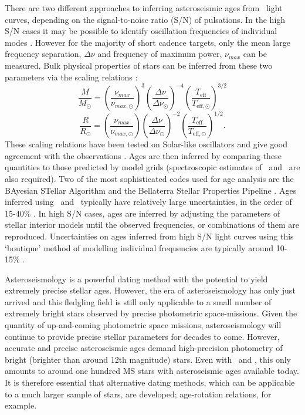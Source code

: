 There are two different approaches to inferring asteroseismic ages from
\kepler\ light curves, depending on the signal-to-noise ratio (S/N) of
pulsations.
In the high S/N cases it may be possible to identify
oscillation frequencies of individual modes \citep[\eg][]{Metcalfe2010,
Silva-aguirre2012, Lebreton2014}.
However for the majority of short cadence targets, only the
mean large frequency separation, $\Delta\nu$ and frequency of maximum power,
$\nu_{max}$ can be measured.
Bulk physical properties of stars can be inferred from these two parameters
via the scaling relations \citep{Brown1991, Kjeldsen1995}:
\begin{equation}
    \frac{M}{M_\odot} = \left(\frac{\nu_{max}}{\nu_{max,\odot}}\right)^3
    \left(\frac{\Delta\nu}{\Delta\nu_\odot}\right)^{-4}
    \left(\frac{T_{\mathrm{eff}}}{T_{\mathrm{eff},\odot}}\right)^{3/2}
\end{equation}
\begin{equation}
    \frac{R}{R_\odot} = \left(\frac{\nu_{max}}{\nu_{max,\odot}}\right)
    \left(\frac{\Delta\nu}{\Delta\nu_\odot}\right)^{-2}
    \left(\frac{T_{\mathrm{eff}}}{T_{\mathrm{eff},\odot}}\right)^{1/2}.
\end{equation}
These scaling relations have been tested on Solar-like oscillators and give
good agreement with the observations \citep[\eg][]{Chaplin2013, Coelho2015}.
Ages are then inferred by comparing these quantities to those predicted by
model grids (spectroscopic estimates of \teff\ and \feh\ are also required).
Two of the most sophisticated codes used for age analysis are the BAyesian
STellar Algorithm \citep[BASTA][]{Silva-aguirre2015} and the Bellaterra
Stellar Properties Pipeline \citep{Serenelli2013}.
Ages inferred using \dnu\ and \numax\ typically have relatively large
uncertainties, in the order of 15-40\% \citep{Silva-aguirre2015a}.
In high S/N cases, ages are inferred by adjusting the parameters of stellar
interior models \citep[\eg][]{Kjeldsen2008} until the observed frequencies, or
combinations of them are reproduced.
Uncertainties on ages inferred from high S/N light curves using this
`boutique' method of modelling individual frequencies are typically around
10-15\% \citep{Silva-aguirre2015a}.

Asteroseismology is a powerful dating method with the potential to yield
extremely precise stellar ages.
However, the era of asteroseismology has only just arrived and this fledgling
field is still only applicable to a small number of extremely bright stars
observed by precise photometric space-missions.
Given the quantity of up-and-coming photometric space missions,
asteroseismology will continue to provide precise stellar parameters for
decades to come.
However, accurate and precise asteroseismic ages demand high-precision
photometry of bright (brighter than around 12th magnitude) stars.
Even with \kepler\ and \corot, this only amounts to around one hundred MS
stars with asteroseismic ages available today.
It is therefore essential that alternative dating methods, which can be
applicable to a much larger sample of stars, are developed; age-rotation
relations, for example.

